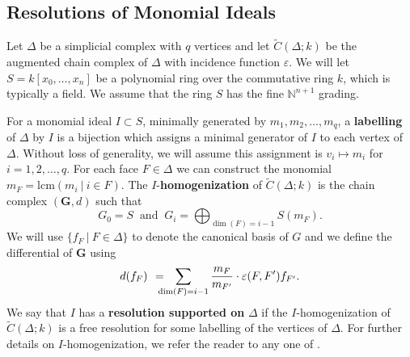 \documentclass[12pt,leqno]{amsart}
\theoremstyle{definition}
\begin{document}
\addtocounter{section}{1}
\subsection{Resolutions of Monomial Ideals}
\label{S:Resolutions of Monomial Ideals}
%

%
Let $\Delta$ be a simplicial complex with $q$ vertices and let
$\widetilde C(\Delta;k)$ be the augmented chain complex of $\Delta$ with
incidence function $\varepsilon$. We will let $S = k[x_0,\dotsc,x_n]$ be a
polynomial ring over the commutative ring $k$, which is typically a field. We
assume that the ring $S$ has the fine $\mathbb N^{n+1}$ grading.

For a monomial ideal $I \subset S$, minimally generated by
$m_1,m_2,\dotsc,m_q$, a \textbf{labelling} of $\Delta$ by $I$ is a bijection
which assigns a minimal generator of $I$ to each vertex of $\Delta$. Without
loss of generality, we will assume this assignment is $v_i \longmapsto m_i$
for $i = 1,2,\dotsc,q$. For each face $F \in \Delta$ we can construct the
monomial $m_F = \mathrm{lcm}(m_i \ | \ i \in F )$. The
$I$-\textbf{homogenization} of $\widetilde{C} (\Delta;k)$ is the chain complex
$(\mathbf G, d)$ such that
%
\begin{displaymath}
  G_0 = S \ \text{ and } \ G_i = \bigoplus_{\dim(F) = i-1}S(m_F).
\end{displaymath}
%
We will use $\{f_F \ | \ F \in \Delta \}$ to denote the canonical basis of $G$ and we define the differential of $\mathbf G$ using
%
\begin{displaymath}
  d(f_F) \hspace{4pt} = \hspace{-8pt} \sum_{\dim(F) = i-1} \frac{m_F}{m_{F'}} \cdot \varepsilon(F,F') f_{F'}.
\end{displaymath}
%
We say that $I$ has a \textbf{resolution supported on} $\Delta$ if the
$I$-homogenization of $\widetilde C(\Delta; k)$ is a free resolution for some
labelling of the vertices of $\Delta$. For further details on
$I$-homogenization, we refer the reader to any one of \cite{BPS, MS, Peeva,
  PV}.
%
\end{document}
